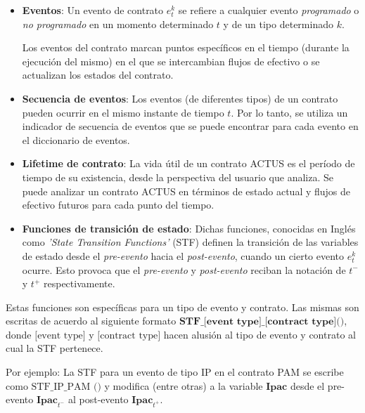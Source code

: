\documentclass{beamer}
\begin{document}
\begin{frame}
    \begin{itemize}
        \item \textbf{Eventos}: Un evento de contrato $e_t^k$ se refiere a cualquier evento \textit{programado} o \textit{no programado} en un momento determinado $t$ y de un tipo determinado $k$. 

        Los eventos del contrato marcan puntos específicos en el tiempo (durante la ejecución del mismo) en el que se intercambian flujos de efectivo o se actualizan los estados del contrato. 
        \pause

        \item \textbf{Secuencia de eventos}: Los eventos (de diferentes tipos) de un contrato pueden ocurrir en el mismo instante de tiempo $t$.
        Por lo tanto, se utiliza un indicador de secuencia de eventos que se puede encontrar para cada evento en el diccionario de eventos.
    \pause
        \item \textbf{Lifetime de contrato}: La vida útil de un contrato ACTUS es el período de tiempo de su existencia, desde la perspectiva del usuario que analiza. Se puede analizar un contrato ACTUS en términos de estado actual y flujos de efectivo futuros para cada punto del tiempo. 
    \end{itemize}
\end{frame}

\begin{frame}
    \begin{itemize}
        \item \textbf{Funciones de transición de estado}: Dichas funciones, conocidas en Inglés como \textit{'State Transition Functions'} (STF) definen la transición de las variables de estado desde el \textit{pre-evento} hacia el \textit{post-evento}, cuando un cierto evento $e^k_t$ ocurre. Esto provoca que el  \textit{pre-evento} y \textit{post-evento} reciban la notación de $t^-$ y $t^+$ respectivamente.

  \end{itemize}
  \pause
  \vfill
  Estas funciones son específicas para un tipo de evento y contrato. Las mismas son escritas de acuerdo al siguiente formato $\textbf{STF\_[event type]\_[contract type]()}$, donde $\text{[event type]}$ y $\text{[contract type]}$ hacen alusión al tipo de evento y contrato al cual la STF pertenece.
  \medskip
  \pause

  Por ejemplo: La STF para un evento de tipo IP en el contrato PAM se escribe como $\text{STF\_IP\_PAM ()}$ y modifica (entre otras) a la variable $\textbf{Ipac}$ desde el pre-evento $\textbf{Ipac}_{t^-}$ al post-evento $\textbf{Ipac}_{t^+}$.

\end{frame}
\end{document}

